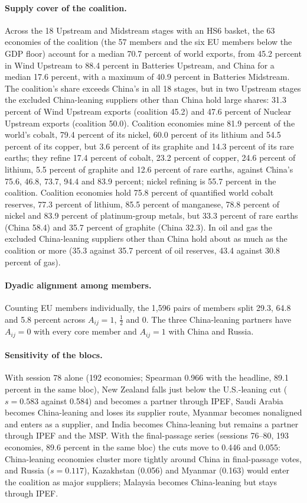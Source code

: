 \paragraph{Supply cover of the coalition.} Across the 18 Upstream and Midstream stages with an HS6
basket, the 63 economies of the coalition (the 57 members and the six EU members below the GDP floor) account for a median 70.7 percent of world exports, from
45.2 percent in Wind Upstream to 88.4 percent in Batteries Upstream, and China for a median 17.6
percent, with a maximum of 40.9 percent in Batteries Midstream. The coalition's share exceeds China's
in all 18 stages, but in two Upstream stages the excluded China-leaning suppliers other than China
hold large shares: 31.3 percent of Wind Upstream exports (coalition 45.2) and 47.6 percent of Nuclear
Upstream exports (coalition 50.0). Coalition economies mine 81.9 percent of the world's cobalt, 79.4
percent of its nickel, 60.0 percent of its lithium and 54.5 percent of its copper, but 3.6 percent of
its graphite and 14.3 percent of its rare earths; they refine 17.4 percent of cobalt, 23.2 percent of
copper, 24.6 percent of lithium, 5.5 percent of graphite and 12.6 percent of rare earths, against
China's 75.6, 46.8, 73.7, 94.4 and 83.9 percent; nickel refining is 55.7 percent in the coalition.
Coalition economies hold 75.8 percent of quantified world cobalt reserves, 77.3 percent of lithium,
85.5 percent of manganese, 78.8 percent of nickel and 83.9 percent of platinum-group metals, but 33.3
percent of rare earths (China 58.4) and 35.7 percent of graphite (China 32.3). In oil and gas the
excluded China-leaning suppliers other than China hold about as much as the coalition or more (35.3
against 35.7 percent of oil reserves, 43.4 against 30.8 percent of gas).

\paragraph{Dyadic alignment among members.} Counting EU members individually, the 1,596 pairs of
members split 29.3, 64.8 and 5.8 percent across $A_{ij}=1$, $\tfrac12$ and 0. The three China-leaning
partners have $A_{ij}=0$ with every core member and $A_{ij}=1$ with China and Russia.

\paragraph{Sensitivity of the blocs.} With session 78 alone (192 economies; Spearman 0.966 with the
headline, 89.1 percent in the same bloc), New Zealand falls just
below the U.S.-leaning cut ($s=0.583$ against 0.584) and becomes a partner through IPEF, Saudi Arabia
becomes China-leaning and loses its supplier route, Myanmar becomes nonaligned and enters as a
supplier, and India becomes China-leaning but remains a partner through IPEF and the MSP. With the
final-passage series (sessions 76--80, 193 economies, 89.6 percent in the same bloc) the cuts move to
0.446 and 0.055: China-leaning economies cluster more tightly around China in final-passage votes,
and Russia ($s=0.117$), Kazakhstan (0.056) and Myanmar (0.163) would enter the coalition as major
suppliers; Malaysia becomes China-leaning but stays through IPEF.

